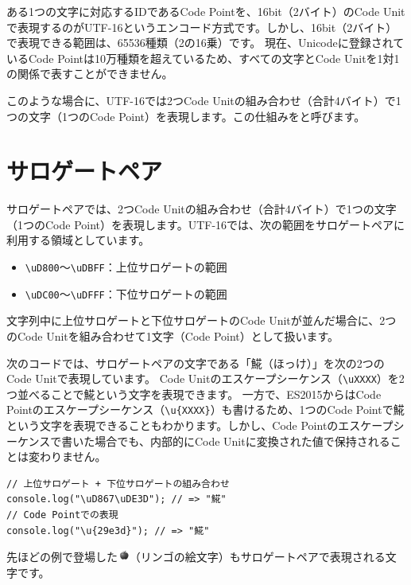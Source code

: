 ある1つの文字に対応するIDであるCode Pointを、16bit（2バイト）のCode
Unitで表現するのがUTF-16というエンコード方式です。しかし、16bit（2バイト）で表現できる範囲は、65536種類（2の16乗）です。
現在、Unicodeに登録されているCode
Pointは10万種類を超えているため、すべての文字とCode
Unitを1対1の関係で表すことができません。

このような場合に、UTF-16では2つCode
Unitの組み合わせ（合計4バイト）で1つの文字（1つのCode
Point）を表現します。この仕組みを\textbf{}と呼びます。

\hypertarget{surrogate-pair}{%
\section{サロゲートペア}\label{surrogate-pair}}

サロゲートペアでは、2つCode
Unitの組み合わせ（合計4バイト）で1つの文字（1つのCode
Point）を表現します。UTF-16では、次の範囲をサロゲートペアに利用する領域としています。

\begin{itemize}
\item
  \texttt{\textbackslash uD800}～\texttt{\textbackslash uDBFF}：上位サロゲートの範囲
\item
  \texttt{\textbackslash uDC00}～\texttt{\textbackslash uDFFF}：下位サロゲートの範囲
\end{itemize}

文字列中に上位サロゲートと下位サロゲートのCode
Unitが並んだ場合に、2つのCode Unitを組み合わせて1文字（Code
Point）として扱います。

次のコードでは、サロゲートペアの文字である「𩸽（ほっけ）」を次の2つのCode
Unitで表現しています。 Code
Unitのエスケープシーケンス（\texttt{\textbackslash uXXXX}）を2つ並べることで𩸽という文字を表現できます。
一方で、ES2015からはCode
Pointのエスケープシーケンス（\texttt{\textbackslash u\{XXXX\}}）も書けるため、1つのCode
Pointで𩸽という文字を表現できることもわかります。しかし、Code
Pointのエスケープシーケンスで書いた場合でも、内部的にCode
Unitに変換された値で保持されることは変わりません。

\begin{lstlisting}
// 上位サロゲート + 下位サロゲートの組み合わせ
console.log("\uD867\uDE3D"); // => "𩸽"
// Code Pointでの表現
console.log("\u{29e3d}"); // => "𩸽"
\end{lstlisting}

先ほどの例で登場した\includegraphics[clip,height=4mm]{fig/apple.eps}（リンゴの絵文字）もサロゲートペアで表現される文字です。

